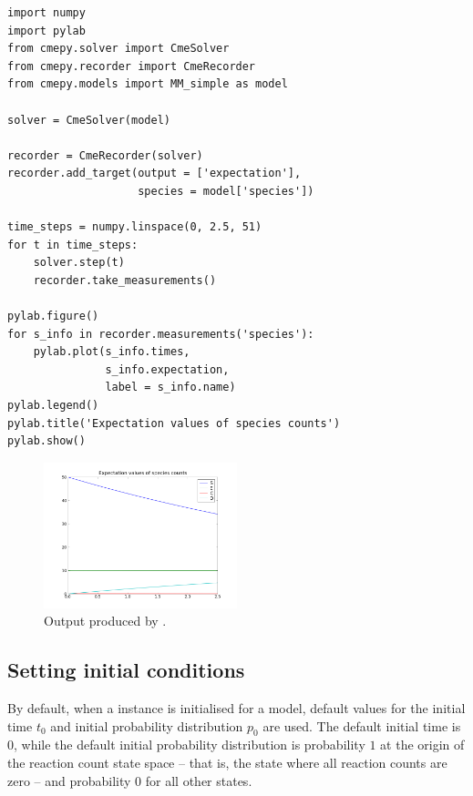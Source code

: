 \begin{lstlisting}[frame=tb,
caption={Example: solving a model and plotting species counts},
label=combiningSolverRecorderPylab]
import numpy
import pylab
from cmepy.solver import CmeSolver
from cmepy.recorder import CmeRecorder
from cmepy.models import MM_simple as model

solver = CmeSolver(model)

recorder = CmeRecorder(solver)
recorder.add_target(output = ['expectation'],
                    species = model['species'])

time_steps = numpy.linspace(0, 2.5, 51)
for t in time_steps:
    solver.step(t)
    recorder.take_measurements()

pylab.figure()
for s_info in recorder.measurements('species'):
    pylab.plot(s_info.times,
               s_info.expectation,
               label = s_info.name)
pylab.legend()
pylab.title('Expectation values of species counts')
pylab.show()
\end{lstlisting}

\begin{figure}[p!]
\centering
\includegraphics[width=0.5\textwidth]{./fig_combiningSolverRecorderPylab.png}
\caption{Output produced by .}
\label{fig:combiningSolverRecorderPylab}
\end{figure}

\subsection{Setting  initial conditions}
By default, when a  instance is initialised for a model, default
values for the initial time $t_0$ and initial probability distribution $p_0$
are used. The default initial time is $0$, while the default initial
probability distribution is probability $1$ at the origin of the reaction
count state space -- that is, the state where all reaction counts are zero --
and probability $0$ for all other states.

